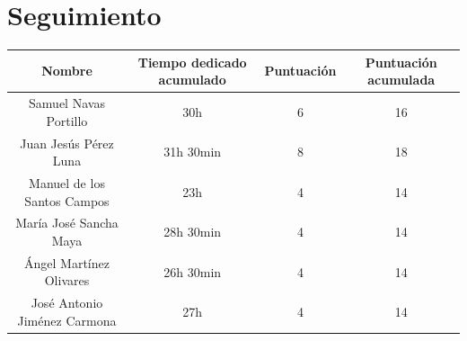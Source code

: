 \documentclass[11 pt]{book}
\begin{document}
	\section{Seguimiento}
		\begin{tabular}{|c|c|c|c|}
			\hline
			Nombre & Tiempo dedicado acumulado & Puntuación & Puntuación acumulada\\
			\hline
			Samuel Navas Portillo & 30h & 6 & 16\\
			Juan Jesús Pérez Luna & 31h 30min & 8 & 18\\
			Manuel de los Santos Campos & 23h & 4 & 14\\
			María José Sancha Maya & 28h 30min & 4 & 14\\
			Ángel Martínez Olivares & 26h 30min & 4 & 14\\
			José Antonio Jiménez Carmona & 27h & 4 & 14\\
			\hline
		\end{tabular}
\end{document}
